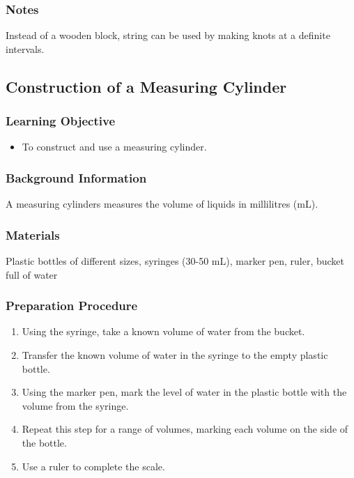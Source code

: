 \subsubsection*{Notes}
Instead of a wooden block, string can be used by making knots at a definite intervals.


\subsection{Construction of a Measuring Cylinder}
\label{sub:meascyl}

\subsubsection*{Learning Objective}
\begin{itemize}
\item{To construct and use a measuring cylinder.} 
\end{itemize}

\subsubsection*{Background Information}
A measuring cylinders measures the volume of liquids in millilitres (mL).

\subsubsection*{Materials}
Plastic bottles of different sizes, syringes (30-50 mL), marker pen, ruler, bucket full of water

\subsubsection*{Preparation Procedure}
\begin{enumerate}
\item{Using the syringe, take a known volume of water from the bucket.} 
\item{Transfer the known volume of water in the syringe to the empty plastic bottle.} 
\item{Using the marker pen, mark the level of water in the plastic bottle with the volume from the syringe.}
\item{Repeat this step for a range of volumes, marking each volume on the side of the bottle.}
\item{Use a ruler to complete the scale.} 
\end{enumerate}

